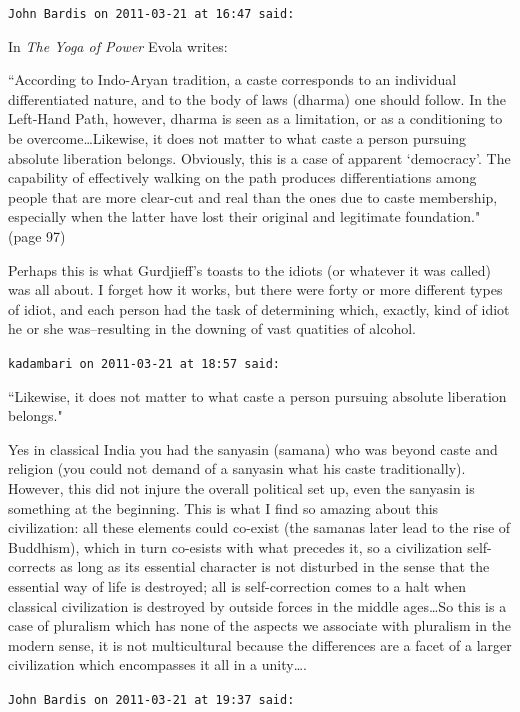 \begin{footnotesize}
\begin{sffamily}
\hfill

\texttt{John Bardis on 2011-03-21 at 16:47 said: }

In \textit{The Yoga of Power} Evola writes:

``According to Indo-Aryan tradition, a caste corresponds to an individual differentiated nature, and to the body of laws (dharma) one should follow. In the Left-Hand Path, however, dharma is seen as a limitation, or as a conditioning to be overcome…Likewise, it does not matter to what caste a person pursuing absolute liberation belongs. Obviously, this is a case of apparent `democracy'. The capability of effectively walking on the path produces differentiations among people that are more clear-cut and real than the ones due to caste membership, especially when the latter have lost their original and legitimate foundation." (page 97)

Perhaps this is what Gurdjieff's toasts to the idiots (or whatever it was called) was all about. I forget how it works, but there were forty or more different types of idiot, and each person had the task of determining which, exactly, kind of idiot he or she was–resulting in the downing of vast quatities of alcohol.


\hfill

\texttt{kadambari on 2011-03-21 at 18:57 said: }

``Likewise, it does not matter to what caste a person pursuing absolute liberation belongs."

Yes in classical India you had the sanyasin (samana) who was beyond caste and religion (you could not demand of a sanyasin what his caste traditionally). However, this did not injure the overall political set up, even the sanyasin is something at the beginning. This is what I find so amazing about this civilization: all these elements could co-exist (the samanas later lead to the rise of Buddhism), which in turn co-esists with what precedes it, so a civilization self-corrects as long as its essential character is not disturbed in the sense that the essential way of life is destroyed; all is self-correction comes to a halt when classical civilization is destroyed by outside forces in the middle ages…So this is a case of pluralism which has none of the aspects we associate with pluralism in the modern sense, it is not multicultural because the differences are a facet of a larger civilization which encompasses it all in a unity….


\hfill

\texttt{John Bardis on 2011-03-21 at 19:37 said: }


\end{sffamily}
\end{footnotesize}

